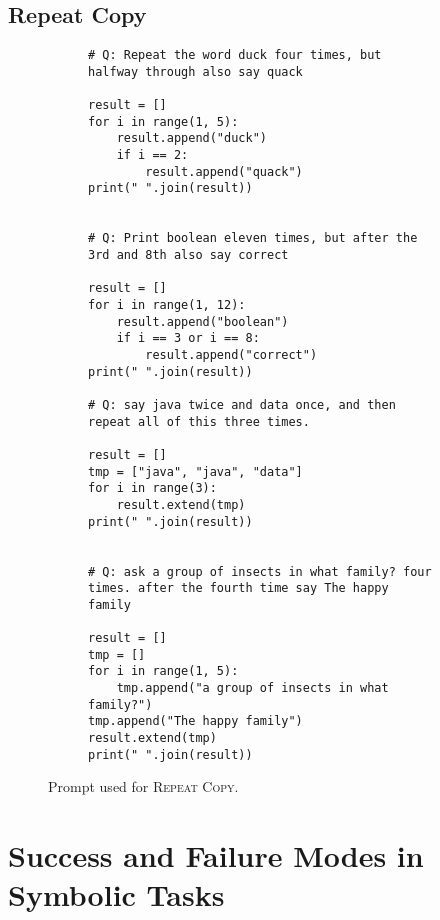 \documentclass[dvipsnames]{article} \usepackage[accepted]{icml2022}
\newcommand{\repeatcopy}{\textsc{Repeat Copy}\xspace}
\begin{document}
\subsection{Repeat Copy}
\begin{figure*}[!h]
\centering
\begin{subfigure}[t]{.95\textwidth}
 \begin{verbatim}
# Q: Repeat the word duck four times, but halfway through also say quack

result = []
for i in range(1, 5):
    result.append("duck")
    if i == 2:
        result.append("quack")
print(" ".join(result))


# Q: Print boolean eleven times, but after the 3rd and 8th also say correct

result = []
for i in range(1, 12):
    result.append("boolean")
    if i == 3 or i == 8:
        result.append("correct")
print(" ".join(result))

# Q: say java twice and data once, and then repeat all of this three times.

result = []
tmp = ["java", "java", "data"]
for i in range(3):
    result.extend(tmp)
print(" ".join(result))


# Q: ask a group of insects in what family? four times. after the fourth time say The happy family

result = []
tmp = []
for i in range(1, 5):
    tmp.append("a group of insects in what family?")
tmp.append("The happy family")
result.extend(tmp)
print(" ".join(result))

\end{verbatim}
\label{fig:repeatcopy:ours}
\end{subfigure}
\caption{Prompt used for \repeatcopy.}
 \end{figure*}


  
  
  

\clearpage
\section{Success and Failure Modes in Symbolic Tasks}
\end{document}
